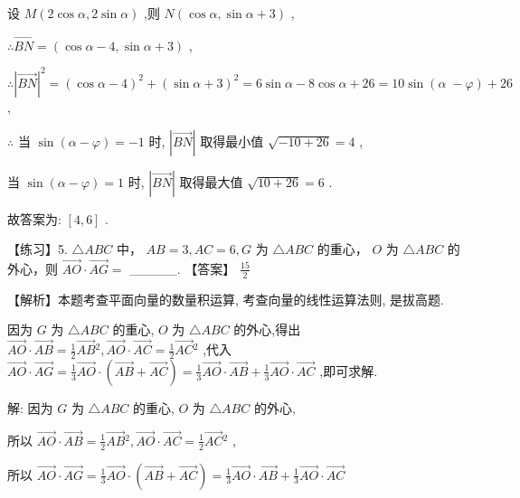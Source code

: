 \documentclass[10pt]{article}
\begin{document}
设 \(M\left( {2\cos \alpha ,2\sin \alpha }\right)\) ,则 \(N\left( {\cos \alpha ,\sin \alpha  + 3}\right)\) ,

\(\therefore \overrightarrow{BN} = \left( {\cos \alpha  - 4,\sin \alpha  + 3}\right)\) ,

\(\therefore {\left| \overrightarrow{BN}\right| }^{2} = {\left( \cos \alpha  - 4\right) }^{2} + {\left( \sin \alpha  + 3\right) }^{2} = 6\sin \alpha  - 8\cos \alpha  + {26} = {10}\sin (\alpha \; - \varphi ) + {26}\) ,

\(\therefore\) 当 \(\sin \left( {\alpha  - \varphi }\right)  =  - 1\) 时, \(\left| \overrightarrow{BN}\right|\) 取得最小值 \(\sqrt{-{10} + {26}} = 4\) ,

当 \(\sin \left( {\alpha  - \varphi }\right)  = 1\) 时, \(\left| \overrightarrow{BN}\right|\) 取得最大值 \(\sqrt{{10} + {26}} = 6\) .

故答案为: \(\left\lbrack  {4,6}\right\rbrack\) .

【练习】5. \(\bigtriangleup  {ABC}\) 中， \({AB} = 3,{AC} = 6,G\) 为 \(\bigtriangleup  {ABC}\) 的重心， \(O\) 为 \(\bigtriangleup  {ABC}\) 的外心，则 \(\overrightarrow{AO} \cdot  \overrightarrow{AG} =\) \_\_\_\_\_. 【答案】 \(\frac{15}{2}\)

【解析】本题考查平面向量的数量积运算, 考查向量的线性运算法则, 是拔高题.

因为 \(G\) 为 \(\bigtriangleup {ABC}\) 的重心, \(O\) 为 \(\bigtriangleup {ABC}\) 的外心,得出 \(\overrightarrow{AO} \cdot  \overrightarrow{AB} = \frac{1}{2}\overrightarrow{AB}{}^{2},\overrightarrow{AO} \cdot  \overrightarrow{AC} = \frac{1}{2}\overrightarrow{AC}{}^{2}\) ,代入 \(\overrightarrow{AO} \cdot  \overrightarrow{AG} = \frac{1}{3}\overrightarrow{AO} \cdot  \left( {\overrightarrow{AB} + \overrightarrow{AC}}\right)  = \frac{1}{3}\overrightarrow{AO} \cdot  \overrightarrow{AB} + \frac{1}{3}\overrightarrow{AO} \cdot  \overrightarrow{AC}\) ,即可求解.

解: 因为 \(G\) 为 \(\bigtriangleup {ABC}\) 的重心, \(O\) 为 \(\bigtriangleup {ABC}\) 的外心,

所以 \(\overrightarrow{AO} \cdot  \overrightarrow{AB} = \frac{1}{2}\overrightarrow{AB}{}^{2},\overrightarrow{AO} \cdot  \overrightarrow{AC} = \frac{1}{2}\overrightarrow{AC}{}^{2}\) ,

所以 \(\overrightarrow{AO} \cdot  \overrightarrow{AG} = \frac{1}{3}\overrightarrow{AO} \cdot  \left( {\overrightarrow{AB} + \overrightarrow{AC}}\right)  = \frac{1}{3}\overrightarrow{AO} \cdot  \overrightarrow{AB} + \frac{1}{3}\overrightarrow{AO} \cdot  \overrightarrow{AC}\)
\end{document}
